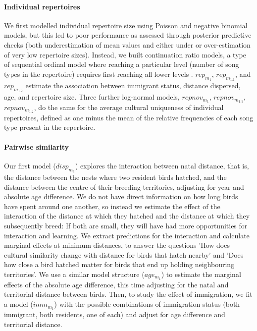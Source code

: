 \documentclass[9pt, onecolumn, twoside, lineno]{gsajnl}
\begin{document}
\paragraph{Individual repertoires}
We first modelled individual repertoire size using Poisson and negative binomial models, but this led to poor performance as assessed through posterior predictive checks (both underestimation of mean values and either under or over-estimation of very low repertoire sizes). Instead, we built continuation ratio models, a type of sequential ordinal model where reaching a particular level (number of song types in the repertoire) requires first reaching all lower levels \autocite{chambers2023, warti2020}. $rep_{m_1}$, $rep_{m_{1.1}}$, and $rep_{m_{1.2}}$ estimate the association between immigrant status, distance dispersed, age, and repertoire size. Three further log-normal models, $repnov_{m_1}$, $repnov_{m_{1.1}}$, $repnov_{m_{1.2}}$, do the same for the average cultural uniqueness of individual repertoires, defined as one minus the mean of the relative frequencies of each song type present in the repertoire.

\paragraph{Pairwise similarity}
Our first model ($disp_{m_1}$) explores the interaction between natal distance, that is, the distance between the nests where two resident birds hatched, and the distance between the centre of their breeding territories, adjusting for year and absolute age difference. We do not have direct information on how long birds have spent around one another, so instead we estimate the effect of the interaction of the distance at which they hatched and the distance at which they subsequently breed: If both are small, they will have had more opportunities for interaction and learning. We extract predictions for the interaction and calculate marginal effects at minimum distances, to answer the questions 'How does cultural similarity change with distance for birds that hatch nearby' and 'Does how close a bird hatched matter for birds that end up holding neighbouring territories'. We use a similar model structure ($age_{m_1}$) to estimate the marginal effects of the absolute age difference, this time adjusting for the natal and territorial distance between birds. Then, to study the effect of immigration, we fit a model ($imm_{m_1}$) with the possible combinations of immigration status (both immigrant, both residents, one of each) and adjust for age difference and territorial distance. 
\end{document}
